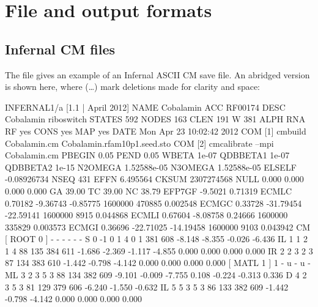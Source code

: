 \section{File and output formats}
\label{section:formats}
\setcounter{footnote}{0}

\subsection{Infernal CM files}
\label{section:savefiles}

The file  gives an example of an Infernal ASCII
CM save file. An abridged version is shown here, where (\ldots) mark
deletions made for clarity and space:

\begin{tinysreoutput}
INFERNAL1/a [1.1 | April 2012]
NAME     Cobalamin
ACC      RF00174
DESC     Cobalamin riboswitch
STATES   592
NODES    163
CLEN     191
W        381
ALPH     RNA
RF       yes
CONS     yes
MAP      yes
DATE     Mon Apr 23 10:02:42 2012
COM      [1] cmbuild Cobalamin.cm Cobalamin.rfam10p1.seed.sto
COM      [2] cmcalibrate --mpi Cobalamin.cm
PBEGIN   0.05
PEND     0.05
WBETA    1e-07
QDBBETA1 1e-07
QDBBETA2 1e-15
N2OMEGA  1.52588e-05
N3OMEGA  1.52588e-05
ELSELF   -0.08926734
NSEQ     431
EFFN     6.495564
CKSUM    2307274568
NULL     0.000  0.000  0.000  0.000 
GA       39.00
TC       39.00
NC       38.79
EFP7GF   -9.5021 0.71319
ECMLC    0.70182    -9.36743    -0.85775     1600000      470885  0.002548
ECMGC    0.33728   -31.79454   -22.59141     1600000        8915  0.044868
ECMLI    0.67604    -8.08758     0.24666     1600000      335829  0.003573
ECMGI    0.36696   -22.71025   -14.19458     1600000        9103  0.043942
CM
                                             [ ROOT    0 ]      -      - - - - -
     S     0    -1 0     1     4     0     1   381   608  -8.148  -8.355  -0.026  -6.436                 
    IL     1     1 2     1     4    88   135   384   611  -1.686  -2.369  -1.117  -4.855                  0.000  0.000  0.000  0.000 
    IR     2     2 3     2     3    87   134   383   610  -1.442  -0.798  -4.142                          0.000  0.000  0.000  0.000 
                                             [ MATL    1 ]      1      - u - u -
    ML     3     2 3     5     3    88   134   382   609  -9.101  -0.009  -7.755                          0.108 -0.224 -0.313  0.336 
     D     4     2 3     5     3    81   129   379   606  -6.240  -1.550  -0.632                         
    IL     5     5 3     5     3    86   133   382   609  -1.442  -0.798  -4.142                          0.000  0.000  0.000  0.000 

\end{tinysreoutput}
